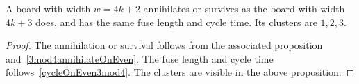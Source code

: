 \documentclass[12pt,letterpaper]{article}
\begin{document}
\begin{cor} \label{2mod4Characterization}
  A board with width $w=4k+2$ annihilates or survives as the board with width $4k+3$ does, and has the same fuse length and cycle time. Its clusters are $1,2,3$. 
\end{cor}
\begin{proof}
  The annihilation or survival follows from the associated proposition and~\cref{3mod4annihilateOnEven}. The fuse length and cycle time follows~\cref{cycleOnEven3mod4}. The clusters are visible in the above proposition.
\end{proof}
\end{document}
